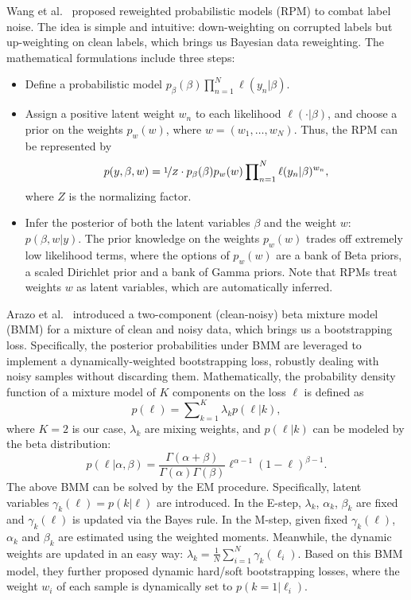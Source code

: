 Wang et al.~ proposed reweighted probabilistic models (RPM) to combat label noise. 
The idea is simple and intuitive: down-weighting on corrupted labels but up-weighting on clean labels, which brings us Bayesian data reweighting. The mathematical formulations include three steps:
\begin{itemize}[leftmargin=15px]
\item[1)] Define a probabilistic model $p_{\beta}(\beta)\prod_{n=1}^{N}\ell(y_n|\beta)$.
\item[2)] Assign a positive latent weight $w_n$ to each likelihood $\ell(\cdot|\beta)$,
and choose a prior on the weights $p_w(w)$, where $w=(w_1,\ldots, w_N)$. Thus, the RPM can be represented by
\begin{equation*}
p(y,\beta,w)
= \nicefrac{1}{Z} \cdot p_{\beta}(\beta)p_{w}(w)
\prod\nolimits_{n=1}^{N}\ell(y_n|\beta)^{w_n},
\end{equation*}
where $Z$ is the normalizing factor.
\item[3)] Infer the posterior of both the latent variables $\beta$ and the weight $w$: $p(\beta,w|y)$. The prior knowledge on the weights $p_w(w)$ trades off extremely low likelihood terms, where the options of $p_w(w)$ are a bank of Beta priors, a scaled Dirichlet prior and a bank of Gamma priors. Note that RPMs treat weights $w$ as latent variables, which are automatically inferred.
\end{itemize}
Arazo et al.~ introduced a two-component (clean-noisy) beta mixture model (BMM) for a mixture of clean and noisy data, which brings us a bootstrapping loss. Specifically, the posterior probabilities under BMM are leveraged to implement a dynamically-weighted bootstrapping loss, robustly dealing with noisy samples without discarding them. Mathematically, the probability density function 
of a mixture model of $K$ components 
on the loss $\ell$ is defined as
\begin{equation}
p(\ell)
= \sum\nolimits_{k=1}^K \lambda_k p(\ell|k),
\end{equation}
where $K=2$ is our case, $\lambda_k$ are mixing 
weights, and $p(\ell|k)$ can be modeled by the beta distribution:
\begin{equation}
p(\ell|\alpha,\beta)
= \frac{\Gamma(\alpha+\beta)}{\Gamma(\alpha)\Gamma(\beta)} \ell^{\alpha-1} (1-\ell)^{\beta-1}.
\end{equation}
The above BMM can be solved by the EM procedure. Specifically, latent variables $\gamma_k(\ell) = p(k|\ell)$ are introduced. In the E-step,  $\lambda_k$, $\alpha_k$, $\beta_k$ are fixed and $\gamma_k(\ell)$ is updated via the Bayes rule. In the M-step, given fixed $\gamma_k(\ell)$, $\alpha_k$ and $\beta_k$ are estimated using the weighted moments. Meanwhile, the dynamic weights are updated in an easy way: $\lambda_k = \frac{1}{N}\sum_{i=1}^{N}\gamma_k(\ell_i)$. Based on this BMM model, they further proposed dynamic hard/soft bootstrapping losses, where the weight $w_i$ of each sample is dynamically set to $p(k=1|\ell_i)$.

